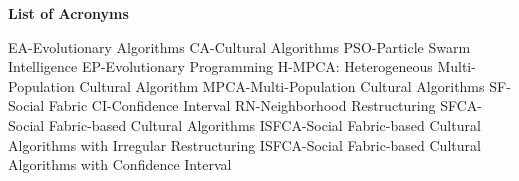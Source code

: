 \newpage
{}
\begin{center}
	\textbf{List of Acronyms}
\end{center}
EA-Evolutionary Algorithms\newline\newline
CA-Cultural Algorithms\newline\newline
PSO-Particle Swarm Intelligence\newline\newline
EP-Evolutionary Programming\newline\newline
H-MPCA: Heterogeneous Multi-Population Cultural Algorithm\newline\newline
MPCA-Multi-Population Cultural Algorithms\newline\newline
SF-Social Fabric\newline\newline
CI-Confidence Interval\newline\newline
RN-Neighborhood Restructuring\newline\newline
SFCA-Social Fabric-based Cultural Algorithms\newline\newline
ISFCA-Social Fabric-based Cultural Algorithms with Irregular Restructuring\newline\newline
ISFCA-Social Fabric-based Cultural Algorithms with Confidence Interval\newline\newline
%
